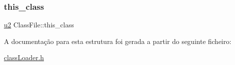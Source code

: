 \mbox{\label{struct_class_file_a2d33db0a560a71b94bc572dd1e4ec03a}} 
\subsubsection{\texorpdfstring{this\+\_\+class}{this\_class}}
{\footnotesize\ttfamily \hyperlink{util_8h_a55ef8d87fd202b8417704c089899c5b9}{u2} Class\+File\+::this\+\_\+class}



A documentação para esta estrutura foi gerada a partir do seguinte ficheiro\+:\begin{DoxyCompactItemize}
\item 
\hyperlink{class_loader_8h}{class\+Loader.\+h}\end{DoxyCompactItemize}
